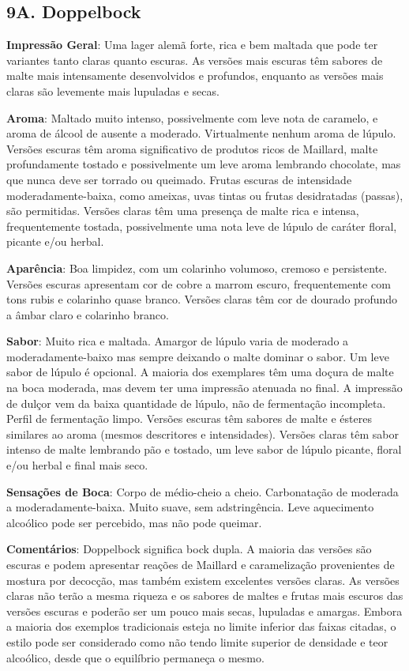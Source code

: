 \subsection*{9A. Doppelbock}
\textbf{Impressão Geral}: Uma lager alemã forte, rica e bem maltada que pode ter variantes tanto claras quanto escuras. As versões mais escuras têm sabores de malte mais intensamente desenvolvidos e profundos, enquanto as versões mais claras são levemente mais lupuladas e secas.

\textbf{Aroma}: Maltado muito intenso, possivelmente com leve nota de caramelo, e aroma de álcool de ausente a moderado. Virtualmente nenhum aroma de lúpulo. Versões escuras têm aroma significativo de produtos ricos de Maillard, malte profundamente tostado e possivelmente um leve aroma lembrando chocolate, mas que nunca deve ser torrado ou queimado. Frutas escuras de intensidade moderadamente-baixa, como ameixas, uvas tintas ou frutas desidratadas (passas), são permitidas. Versões claras têm uma presença de malte rica e intensa, frequentemente tostada, possivelmente uma nota leve de lúpulo de caráter floral, picante e/ou herbal.

\textbf{Aparência}: Boa limpidez, com um colarinho volumoso, cremoso e persistente. Versões escuras apresentam cor de cobre a marrom escuro, frequentemente com tons rubis e colarinho quase branco. Versões claras têm cor de dourado profundo a âmbar claro e colarinho branco.

\textbf{Sabor}: Muito rica e maltada. Amargor de lúpulo varia de moderado a moderadamente-baixo mas sempre deixando o malte dominar o sabor. Um leve sabor de lúpulo é opcional. A maioria dos exemplares têm uma doçura de malte na boca moderada, mas devem ter uma impressão atenuada no final. A impressão de dulçor vem da baixa quantidade de lúpulo, não de fermentação incompleta. Perfil de fermentação limpo. Versões escuras têm sabores de malte e ésteres similares ao aroma (mesmos descritores e intensidades). Versões claras têm sabor intenso de malte lembrando pão e tostado, um leve sabor de lúpulo picante, floral e/ou herbal e final mais seco.

\textbf{Sensações de Boca}: Corpo de médio-cheio a cheio. Carbonatação de moderada a moderadamente-baixa. Muito suave, sem adstringência. Leve aquecimento alcoólico pode ser percebido, mas não pode queimar.

\textbf{Comentários}: Doppelbock significa bock dupla. A maioria das versões são escuras e podem apresentar reações de Maillard e caramelização provenientes de mostura por decocção, mas também existem excelentes versões claras. As versões claras não terão a mesma riqueza e os sabores de maltes e frutas mais escuros das versões escuras e poderão ser um pouco mais secas, lupuladas e amargas. Embora a maioria dos exemplos tradicionais esteja no limite inferior das faixas citadas, o estilo pode ser considerado como não tendo limite superior de densidade e teor alcoólico, desde que o equilíbrio permaneça o mesmo.

